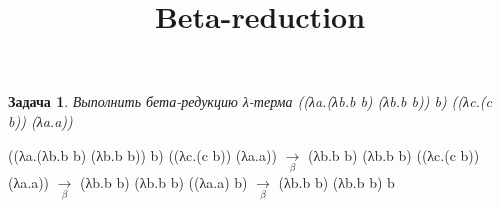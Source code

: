 \documentclass{article}
\date{}
\title{Beta-reduction}
\newtheorem{problem}{Задача}
\begin{document}
\maketitle
\begin{problem}
Выполнить бета-редукцию λ-терма ((λa.(λb.b b) (λb.b b)) b) ((λc.(c b)) (λa.a))
\end{problem}

\Large
\noindent
((λa.(λb.b b) (λb.b b)) b) ((λc.(c b)) (λa.a)) $\underset{\beta}{\longrightarrow}$ (λb.b b) (λb.b b) ((λc.(c b)) (λa.a)) $\underset{\beta}{\longrightarrow}$ 
(λb.b b) (λb.b b) ((λa.a) b) $\underset{\beta}{\longrightarrow}$ (λb.b b) (λb.b b) b 
\end{document}
